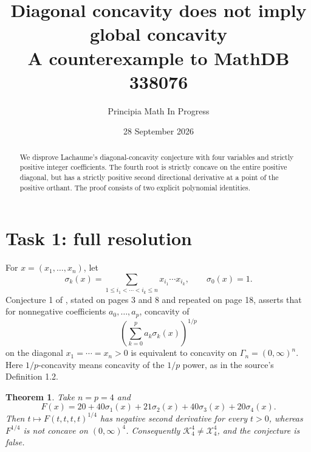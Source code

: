 \documentclass[11pt]{article}
\title{Diagonal concavity does not imply global concavity\\
\large A counterexample to MathDB 338076}
\author{Principia Math In Progress}
\date{28 September 2026}
\newtheorem{theorem}{Theorem}
\begin{document}
\maketitle
\begin{abstract}
We disprove Lachaume's diagonal-concavity conjecture with four variables
and strictly positive integer coefficients. The fourth root is strictly
concave on the entire positive diagonal, but has a strictly positive
second directional derivative at a point of the positive orthant.
The proof consists of two explicit polynomial identities.
\end{abstract}

\section*{Task 1: full resolution}
For $x=(x_1,\ldots,x_n)$, let
\[
 \sigma_k(x)=\sum_{1\le i_1<\cdots<i_k\le n}x_{i_1}\cdots x_{i_k},
 \qquad \sigma_0(x)=1.
\]
Conjecture 1 of \cite{Lachaume}, stated on pages 3 and 8 and repeated
on page 18, asserts that for nonnegative coefficients $a_0,\ldots,a_p$,
concavity of
\[
 \left(\sum_{k=0}^p a_k\sigma_k(x)\right)^{1/p}
\]
on the diagonal $x_1=\cdots=x_n>0$ is equivalent to concavity on
$\Gamma_n=(0,\infty)^n$. Here $1/p$-concavity means concavity of the
$1/p$ power, as in the source's Definition 1.2.

\begin{theorem}
Take $n=p=4$ and
\begin{equation}\label{eq:f}
 F(x)=20+40\sigma_1(x)+21\sigma_2(x)+40\sigma_3(x)+20\sigma_4(x).
\end{equation}
Then $t\mapsto F(t,t,t,t)^{1/4}$ has negative second derivative for
every $t>0$, whereas $F^{1/4}$ is not concave on $(0,\infty)^4$.
Consequently $\mathcal K_4^4\ne\mathcal X_4^4$, and the conjecture is false.
\end{theorem}
\end{document}
